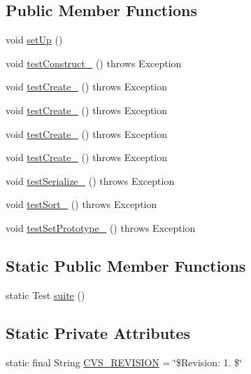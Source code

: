 \subsection*{Public Member Functions}
\begin{DoxyCompactItemize}
\item 
void \hyperlink{classorg_1_1jgap_1_1gp_1_1impl_1_1_g_p_population_test_a46bb73c32338351e05fa319a8dac8311}{set\-Up} ()
\item 
void \hyperlink{classorg_1_1jgap_1_1gp_1_1impl_1_1_g_p_population_test_a01dd4b2f45dd6e9c7ef6de9eb1c8e7b8}{test\-Construct\-\_} ()  throws Exception 
\item 
void \hyperlink{classorg_1_1jgap_1_1gp_1_1impl_1_1_g_p_population_test_a2eaf89ccc2a2b9ccbb103a5cee50f87c}{test\-Create\-\_} ()  throws Exception 
\item 
void \hyperlink{classorg_1_1jgap_1_1gp_1_1impl_1_1_g_p_population_test_aeeefdb7d33e4e7555cecc9591989b3e1}{test\-Create\-\_} ()  throws Exception 
\item 
void \hyperlink{classorg_1_1jgap_1_1gp_1_1impl_1_1_g_p_population_test_a0c2d02f51697a84b44ea7a047a2f838e}{test\-Create\-\_} ()  throws Exception 
\item 
void \hyperlink{classorg_1_1jgap_1_1gp_1_1impl_1_1_g_p_population_test_a00a3ec13991cee55487f096aa477d969}{test\-Create\-\_} ()  throws Exception 
\item 
void \hyperlink{classorg_1_1jgap_1_1gp_1_1impl_1_1_g_p_population_test_afd59def06da6adf1e010e604a04ee473}{test\-Serialize\-\_} ()  throws Exception 
\item 
void \hyperlink{classorg_1_1jgap_1_1gp_1_1impl_1_1_g_p_population_test_a279010252e7b74ab231e017ef82993ce}{test\-Sort\-\_} ()  throws Exception 
\item 
void \hyperlink{classorg_1_1jgap_1_1gp_1_1impl_1_1_g_p_population_test_aa41a4305aac81ed18627fda12889df58}{test\-Set\-Prototype\-\_} ()  throws Exception 
\end{DoxyCompactItemize}
\subsection*{Static Public Member Functions}
\begin{DoxyCompactItemize}
\item 
static Test \hyperlink{classorg_1_1jgap_1_1gp_1_1impl_1_1_g_p_population_test_a2c51b09d08a8cd4aafc3c686c450f64b}{suite} ()
\end{DoxyCompactItemize}
\subsection*{Static Private Attributes}
\begin{DoxyCompactItemize}
\item 
static final String \hyperlink{classorg_1_1jgap_1_1gp_1_1impl_1_1_g_p_population_test_a59a2d0f26373c7db9d2d42ce9cd747af}{C\-V\-S\-\_\-\-R\-E\-V\-I\-S\-I\-O\-N} = \char`\"{}\$Revision\-: 1. \$\char`\"{}
\end{DoxyCompactItemize}
